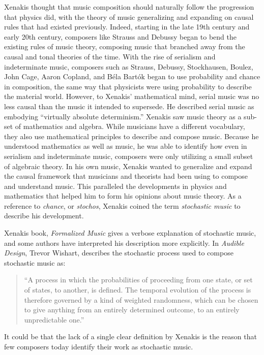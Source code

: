 Xenakis thought that music composition should naturally follow
the progression that physics did, with the theory of music
generalizing and expanding on causal rules that had existed
previously. Indeed, starting in the late 19th century and early 20th
century, composers like Strauss and Debussy began to bend the existing
rules of music theory, composing music that branched away from the
causal and tonal theories of the time. With the rise of
serialism
and indeterminate music, composers such as Strauss, Debussy,
Stockhausen, Boulez, John Cage, Aaron Copland, and B\'{e}la Bart\'{o}k
began to use probability and chance in composition, the same way that
physicists were using probability to describe the material
world. However, to Xenakis' mathematical mind, serial music was no
less causal than the music it intended to supersede. He described
serial music as embodying ``virtually absolute
determinism.''\cite{xenakis1992formalized} Xenakis saw music theory as
a sub-set of mathematics and algebra. While musicians have a different
vocabulary, they also use mathematical principles to describe and
compose music. Because he understood mathematics as well as music, he
was able to identify how even in serialism and indeterminate music,
composers were only utilizing a small subset of algebraic theory. In
his own music, Xenakis wanted to generalize and expand the causal
framework that musicians and theorists had been using to compose and
understand music. This paralleled the developments in physics and
mathematics that helped him to form his opinions about music theory.
As a reference to \emph{chance}, or \emph{stochos}, Xenakis coined the
term \emph{stochastic music} to describe his development.

Xenakis book, \textit{Formalized Music} gives a verbose explanation
of stochastic music, and some authors have interpreted his description
more explicitly. In \textit{Audible Design}, Trevor Wishart, describes
the stochastic process used to compose stochastic music as:
\begin{quotation}
  ``A process in which the probabilities of proceeding from one state,
  or set of states, to another, is defined. The temporal evolution of
  the process is therefore governed by a kind of weighted randomness,
  which can be chosen to give anything from an entirely determined
  outcome, to an entirely unpredictable one.''\cite{Wishart1994}
\end{quotation}
It could be that the lack of a single clear definition by Xenakis is
the reason that few composers today identify their work as stochastic
music.

